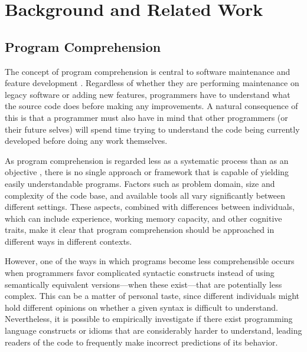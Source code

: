 \section{Background and Related Work}
\label{back}
\subsection{Program Comprehension}


The concept of program comprehension is central to software maintenance and feature development \cite{DBLP:conf/iwpc/TilleySP96}. Regardless of whether they are performing maintenance on legacy software or adding new features, programmers have to understand what the source code does before making any improvements. A natural consequence of this is that a programmer must also have in mind that other programmers (or their future selves) 
will
spend time trying to understand the code being currently developed before doing any work themselves.

As program comprehension is regarded less as a systematic process than as an objective \cite{DBLP:journals/ibmsj/OHareT94}, there is no single approach or framework that is capable of yielding easily understandable programs. Factors such as problem domain, size and complexity of the code base, and available tools all vary significantly between different settings. These aspects, combined with differences between individuals, which can include experience, working memory capacity, and other cognitive traits, make it clear that program comprehension should be approached in different ways in different contexts. 

However, one of the ways in which programs become less comprehensible occurs when programmers favor complicated syntactic constructs instead of using semantically equivalent versions---when these exist---that are potentially less complex. %
This can be a matter of personal taste, since different individuals might hold different opinions on whether a given syntax is difficult to understand. Nevertheless, it is possible to empirically investigate if there exist programming language constructs or idioms that are considerably harder to understand, leading readers of the code to frequently make incorrect predictions of its behavior. 


